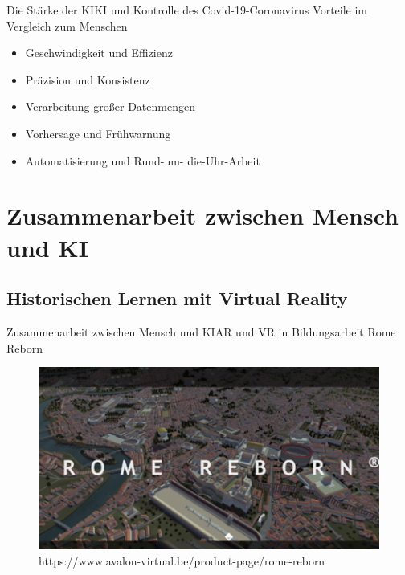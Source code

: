 \documentclass[169,9pt]{beamer}
\begin{document}
\begin{frame}{Die Stärke der KI}{KI und Kontrolle des Covid-19-Coronavirus}
Vorteile im Vergleich zum Menschen
\begin{itemize}
    \item Geschwindigkeit und Effizienz
    \item Präzision und Konsistenz
    \item Verarbeitung großer Datenmengen
    \item Vorhersage und Frühwarnung
    \item Automatisierung und Rund-um-
die-Uhr-Arbeit
\end{itemize}
\end{frame}

\section{Zusammenarbeit zwischen Mensch und KI}
\subsection{Historischen Lernen mit Virtual Reality}

\begin{frame}{Zusammenarbeit zwischen Mensch und KI}{AR und VR in Bildungsarbeit}
Rome Reborn
\begin{figure}[h]
    \centering
    \includegraphics[width=1.0\textwidth]{RomeReburn1.png}
    \caption{\smaller \smaller https://www.avalon-virtual.be/product-page/rome-reborn}
    \label{fig:my_label}
\end{figure}
\end{frame}
\end{document}
